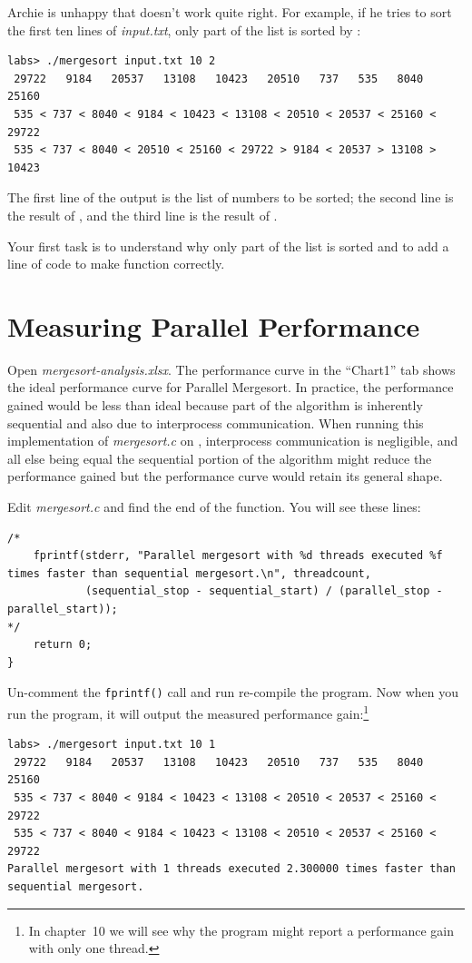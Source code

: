 Archie is unhappy that  doesn't work quite right.
For example, if he tries to sort the first ten lines of \textit{input.txt},
only part of the list is sorted by :

\begin{verbatim}
labs> ./mergesort input.txt 10 2
 29722   9184   20537   13108   10423   20510   737   535   8040   25160
 535 < 737 < 8040 < 9184 < 10423 < 13108 < 20510 < 20537 < 25160 < 29722
 535 < 737 < 8040 < 20510 < 25160 < 29722 > 9184 < 20537 > 13108 > 10423
\end{verbatim}
The first line of the output is the list of numbers to be sorted; the second
line is the result of , and the third line is
the result of .

Your first task is to understand why only part of the list is sorted and to add
a line of code to make  function correctly.

\section{Measuring Parallel Performance}

Open \textit{mergesort-analysis.xlsx}. The performance curve in the ``Chart1''
tab shows the ideal performance curve for Parallel Mergesort. In practice, the
performance gained would be less than ideal because part of the algorithm is
inherently sequential and also due to interprocess communication. When running
this implementation of \textit{mergesort.c} on \runtimeenvironment,
interprocess communication is negligible, and all else being equal the
sequential portion of the algorithm might reduce the performance gained but the
performance curve would retain its general shape.

Edit \textit{mergesort.c} and find the end of the  function. You
will see these lines:
\begin{lstlisting}
/*
    fprintf(stderr, "Parallel mergesort with %d threads executed %f times faster than sequential mergesort.\n", threadcount,
            (sequential_stop - sequential_start) / (parallel_stop - parallel_start));
*/
    return 0;
}
\end{lstlisting}
Un-comment the \lstinline{fprintf()} call and run re-compile the program. Now
when you run the program, it will output the measured performance
gain:\footnote{In chapter~10 we will see why the program might report a
performance gain with only one thread.}
\begin{verbatim}
labs> ./mergesort input.txt 10 1
 29722   9184   20537   13108   10423   20510   737   535   8040   25160
 535 < 737 < 8040 < 9184 < 10423 < 13108 < 20510 < 20537 < 25160 < 29722
 535 < 737 < 8040 < 9184 < 10423 < 13108 < 20510 < 20537 < 25160 < 29722
Parallel mergesort with 1 threads executed 2.300000 times faster than sequential mergesort.
\end{verbatim}

